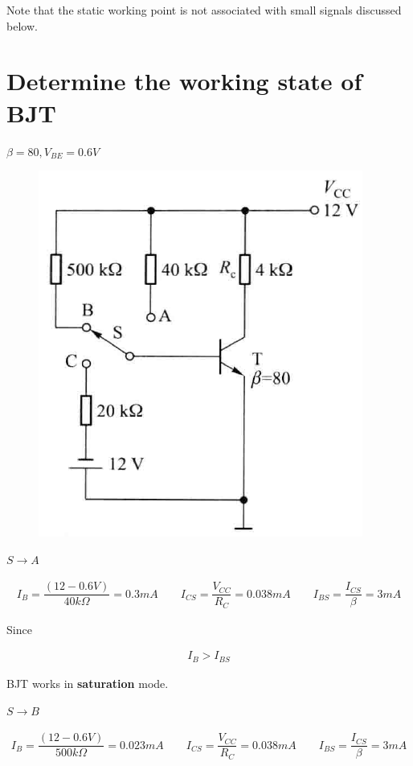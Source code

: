 Note that the static working point is not associated with small signals discussed below.

\section{Determine the working state of BJT}

$\beta = 80, V_{BE} = 0.6 \si{V}$

\begin{figure}[H]
  \centering
  \includegraphics[width=0.5\linewidth]{figures/Working-State-BJT}
\end{figure}

$S \rightarrow A$

\begin{equation*}
  \begin{aligned}
    I_B = \dfrac{\left( 12 - 0.6 \si{V} \right)}{40 \si{k \Omega}} = 0.3 \si{mA} \quad\quad
    I_{CS} = \dfrac{V_{CC}}{R_C} = 0.038 \si{mA} \quad\quad
    I_{BS} = \dfrac{I_{CS}}{\beta} = 3 \si{mA} 
  \end{aligned}
\end{equation*}

Since

\begin{equation*}
  \begin{aligned}
    I_B > I_{BS}
  \end{aligned}
\end{equation*}

BJT works in \textbf{saturation} mode.

$S \rightarrow B$

\begin{equation*}
  \begin{aligned}
    I_B = \dfrac{\left( 12 - 0.6 \si{V} \right)}{500 \si{k \Omega}} = 0.023 \si{mA} \quad\quad
    I_{CS} = \dfrac{V_{CC}}{R_C} = 0.038 \si{mA} \quad\quad
    I_{BS} = \dfrac{I_{CS}}{\beta} = 3 \si{mA} 
  \end{aligned}
\end{equation*}

